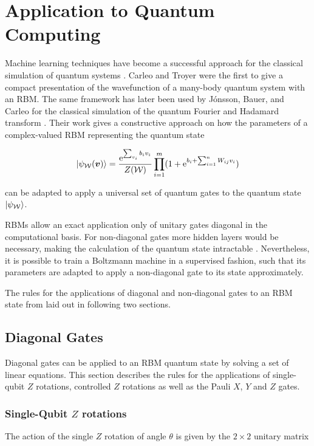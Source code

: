 \section{Application to Quantum Computing}
\label{sec:applicationToQuantumComputing}
Machine learning techniques have become a successful approach for the classical simulation
of quantum systems \cite{carleo2017solving, deng2017quantum, carleo2018constructing}. 
Carleo and Troyer \cite{carleo2017solving} were the first to give a compact presentation of the wavefunction of a many-body quantum system with an RBM.
The same framework has later been used by J\'{o}nsson, Bauer, and Carleo for the classical simulation of the quantum Fourier and Hadamard transform \cite{jnsson2018neuralnetwork}. Their work gives a constructive approach on how the parameters of a complex-valued RBM representing the quantum state

\begin{equation}
   \Ket{\psi_{\mathcal{W}}(\bm{v})} = \frac{\mathrm{e}^{\sum_{v_i}b_iv_i}}{Z(\mathcal{W})}\prod_{i=1}^m(1+\mathrm{e}^{b_i + \sum_{i=1}^nW_{ij}v_i})
\end{equation}

can be adapted to apply a universal set of quantum gates to the quantum state $\Ket{\psi_{\mathcal{W}}}$.

RBMs allow an exact application only of unitary gates diagonal in the computational basis. For non-diagonal 
gates more hidden layers would be necessary, making the calculation of the quantum state intractable \cite{carleo2018constructing}. Nevertheless, it is possible to train a Boltzmann machine in a supervised fashion, such that its parameters are adapted to apply a non-diagonal gate to its state approximately.

The rules for the applications of diagonal and non-diagonal gates to an RBM state from 
\cite{jnsson2018neuralnetwork} laid out in following two sections.

\subsection{Diagonal Gates}

Diagonal gates can be applied to an RBM quantum state by solving a set of linear equations. 
This section describes the rules for the applications of single-qubit $Z$ rotations, controlled $Z$ rotations 
as well as the Pauli $X$, $Y$ and $Z$ gates.

\subsubsection{Single-Qubit $Z$ rotations}
The action of the single $Z$ rotation of angle $\theta$ is given by the $2\times2$ unitary matrix

